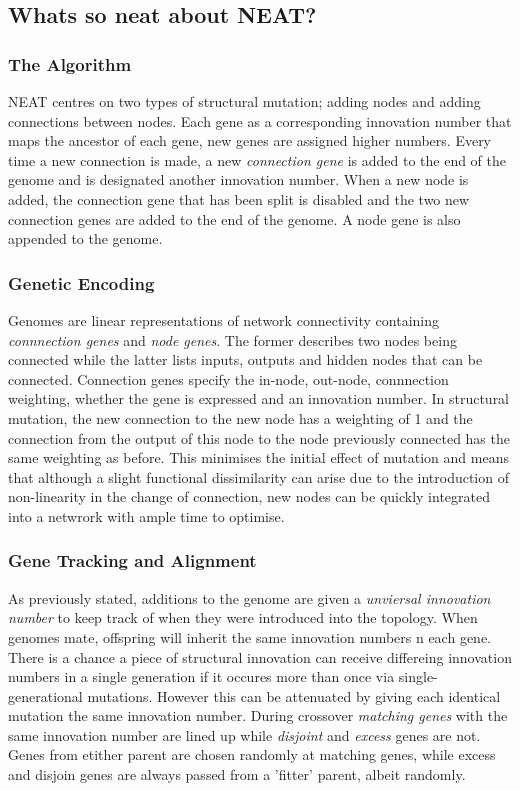 \documentclass{article}
\begin{document}
\subsection*{Whats so neat about NEAT?}
\subsubsection*{The Algorithm}
NEAT centres on two types of structural mutation; adding nodes and adding connections between nodes.
Each gene as a corresponding innovation number that maps the ancestor of each gene, new genes are assigned higher numbers.
Every time a new connection is made, a new \emph{connection gene} is added to the end of the genome and is designated another innovation number.
When a new node is added, the connection gene that has been split is disabled and the two new connection genes are added to the end of the genome.
A node gene is also appended to the genome.
\subsubsection*{Genetic Encoding}
Genomes are linear representations of network connectivity containing \emph{connnection genes} and \emph{node genes}. The former describes two nodes being connected
while the latter lists inputs, outputs and hidden nodes that can be connected. Connection genes specify the in-node, out-node, connnection weighting, whether the gene is expressed and an innovation number.
In structural mutation, the new connection to the new node has a weighting of 1 and the connection from the output of this node to the node previously connected has the same weighting as before.
This minimises the initial effect of mutation and means that although a slight functional dissimilarity can arise due to the introduction of non-linearity in the change of connection, new nodes can be quickly integrated into a netwrork with ample time to optimise.

\subsubsection*{Gene Tracking and Alignment}
As previously stated, additions to the genome are given a \emph{unviersal innovation number} to keep track of when they were introduced into the topology.
When genomes mate, offspring will inherit the same innovation numbers n each gene.
There is a chance a piece of structural innovation can receive differeing innovation numbers in a single generation if it occures more than once via single-generational mutations.
However this can be attenuated by giving each identical mutation the same innovation number.
During crossover \emph{matching genes} with the same innovation number are lined up while \emph{disjoint} and \emph{excess} genes are not. Genes from etither parent are chosen randomly at matching genes, while excess and disjoin genes are always passed from a 'fitter' parent, albeit randomly.
\end{document}
